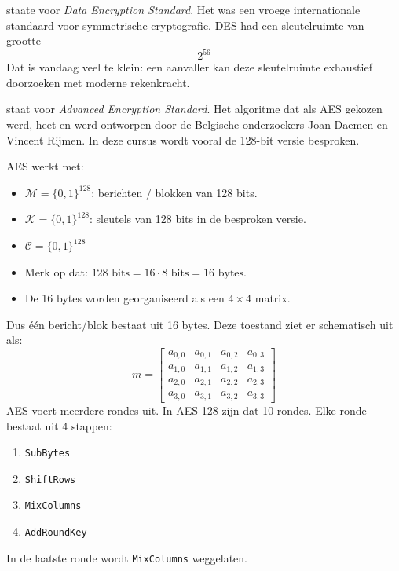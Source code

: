 
 staate voor \emph{Data Encryption Standard}. Het was een vroege internationale standaard voor symmetrische cryptografie. DES had een sleutelruimte van grootte
\begin{equation*}
    2^{56}
\end{equation*}
Dat is vandaag veel te klein: een aanvaller kan deze sleutelruimte exhaustief doorzoeken met moderne rekenkracht.


 staat voor \emph{Advanced Encryption Standard}. Het algoritme dat als AES gekozen werd, heet  en werd ontworpen door de Belgische onderzoekers Joan Daemen en Vincent Rijmen. In deze cursus wordt vooral de 128-bit versie besproken.

AES werkt met:
\begin{itemize}
    \item $\mathcal{M} = \{0, 1\}^{128}$: berichten / blokken van 128 bits.
    \item $\mathcal{K} = \{0, 1\}^{128}$: sleutels van 128 bits in de besproken versie.
    \item $\mathcal{C} = \{0, 1\}^{128}$
    \item Merk op dat: $128 \text{ bits} = 16 \cdot 8 \text{ bits} = 16 \text{ bytes}$.
    \item De 16 bytes worden georganiseerd als een $4 \times 4$ matrix.
\end{itemize}
Dus één bericht/blok bestaat uit 16 bytes. Deze toestand ziet er schematisch uit als:
\begin{equation*}
    m = \begin{bmatrix}
        a_{0,0} & a_{0,1} & a_{0,2} & a_{0,3} \\
        a_{1,0} & a_{1,1} & a_{1,2} & a_{1,3} \\
        a_{2,0} & a_{2,1} & a_{2,2} & a_{2,3} \\
        a_{3,0} & a_{3,1} & a_{3,2} & a_{3,3} 
    \end{bmatrix}
\end{equation*}
AES voert meerdere rondes uit. In AES-128 zijn dat 10 rondes. Elke ronde bestaat uit 4 stappen:
\begin{enumerate}
    \item \texttt{SubBytes}
    \item \texttt{ShiftRows}
    \item \texttt{MixColumns}
    \item \texttt{AddRoundKey}
\end{enumerate}
In de laatste ronde wordt \texttt{MixColumns} weggelaten.

